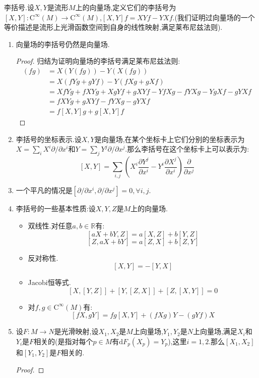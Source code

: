 李括号.设$X,Y$是流形$M$上的向量场,定义它们的李括号为$[X,Y]:\mathrm{C}^{\infty}(M)\to\mathrm{C}^{\infty}(M)$,$[X,Y]f=XYf-YXf$.(我们证明过向量场的一个等价描述是流形上光滑函数空间到自身的线性映射,满足莱布尼兹法则).
\begin{enumerate}
	\item 向量场的李括号仍然是向量场.
	\begin{proof}
		
		归结为证明向量场的李括号满足莱布尼兹法则:
		\begin{align*}
		[X,Y](fg)&=X(Y(fg))-Y(X(fg))\\&=X(fYg+gYf)-Y(fXg+gXf)\\&=XfYg+fXYg+XgYf+gXYf-YfXg-fYXg-YgXf-gYXf\\&=fXYg+gXYf-fYXg-gYXf\\&=f[X,Y]g+g[X,Y]f
		\end{align*}
	\end{proof}
    \item 李括号的坐标表示.设$X,Y$是向量场,在某个坐标卡上它们分别的坐标表示为$X=\sum_iX^i\partial/\partial x^i$和$Y=\sum_jY^j\partial/\partial x^j$.那么李括号在这个坐标卡上可以表示为:
    $$[X,Y]=\sum_{i,j}\left(X^i\frac{\partial Y^j}{\partial x^i}-Y^i\frac{\partial X^j}{\partial x^i}\right)\frac{\partial}{\partial x^j}$$
    \item 一个平凡的情况是$[\partial/\partial x^i,\partial/\partial x^j]=0,\forall i,j$.
    \item 李括号的一些基本性质:设$X,Y,Z$是$M$上的向量场.
    \begin{itemize}
    	\item 双线性.对任意$a,b\in\mathbb{R}$有:
    	$$[aX+bY,Z]=a[X,Z]+b[Y,Z]$$
    	$$[Z,aX+bY]=a[Z,X]+b[Z,Y]$$
    	\item 反对称性.$$[X,Y]=-[Y,X]$$
    	\item Jacobi恒等式.$$[X,[Y,Z]]+[Y,[Z,X]]+[Z,[X,Y]]=0$$
    	\item 对$f,g\in\mathrm{C}^{\infty}(M)$有:$$[fX,gY]=fg[X,Y]+(fXg)Y-(gYf)X$$
    \end{itemize}
    \item 设$F:M\to N$是光滑映射,设$X_1,X_2$是$M$上向量场,$Y_1,Y_2$是$N$上向量场,满足$X_i$和$Y_i$是$F$相关的(是指对每个$p\in M$有$\mathrm{d}F_p(X_p)=Y_p$),这里$i=1,2$.那么$[X_1,X_2]$和$[Y_1,Y_2]$是$F$相关的.
    \begin{proof}
    	

\end{proof}
\end{enumerate}
